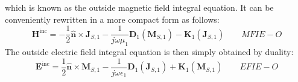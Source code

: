 \documentclass[a4paper,10pt]{book}
\newcommand{\field}[1]{\mathbf{#1}}
\newcommand{\current}[1]{\mathbf{#1}}
\newcommand{\vect}[1]{\mathbf{#1}}
\newcommand{\operator}[1]{\mathbf{#1}}
\begin{document}
which is known as the outside magnetic field integral equation. It can be conveniently rewritten in a more compact form as follows:
\begin{equation}\label{eqn:MFIE-O}
\boxed{
\field{H}^\text{inc} = - \frac{1}{2} \vect{\hat{n}} \times \current{J}_{S,1} - \frac{1}{j \omega \mu_1} \operator{D}_1 \left( \current{M}_{S,1}\right) - \operator{K}_1 \left(\current{J}_{S,1}\right)
} \qquad MFIE-O
\end{equation}
The outside electric field integral equation is then simply obtained by duality:
\begin{equation}\label{eqn:EFIE-O}
\boxed{
\field{E}^\text{inc} =  \frac{1}{2} \vect{\hat{n}} \times \current{M}_{S,1} - \frac{1}{j \omega \epsilon_1} \operator{D}_1 \left( \current{J}_{S,1}\right) + \operator{K}_1 \left(\current{M}_{S,1}\right)
} \qquad EFIE-O
\end{equation}
\end{document}
